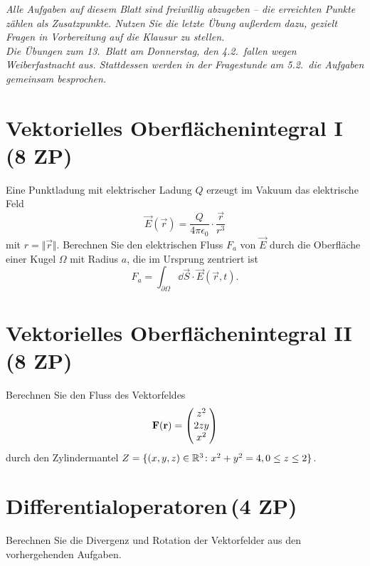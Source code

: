 \documentclass{scrartcl}
\begin{document}
\maketitle
\vspace{1em}
\emph{%
  Alle Aufgaben auf diesem Blatt sind freiwillig abzugeben -- die erreichten Punkte zählen als Zusatzpunkte.
  Nutzen Sie die letzte Übung außerdem dazu, gezielt Fragen in Vorbereitung auf die Klausur zu stellen.\\
  Die Übungen zum 13.\ Blatt am Donnerstag, den 4.2.\ fallen wegen Weiberfastnacht aus.
  Stattdessen werden in der Fragestunde am 5.2.\ die Aufgaben gemeinsam besprochen.
}
\section{Vektorielles Oberflächenintegral I\,(8 ZP)}
\label{sec:gau_scher_integralsatz}

Eine Punktladung mit elektrischer Ladung $Q$ erzeugt im Vakuum das elektrische Feld
\[
  \vec E(\vec r) = \frac{Q}{4\pi \epsilon_0} \cdot \frac{\vec r}{r^3}
\]
mit $r = \Vert \vec r \Vert$.
Berechnen Sie den elektrischen Fluss $F_a$ von $\vec E$ durch die Oberfläche einer Kugel $\Omega$ mit Radius $a$, die im Ursprung zentriert ist
\[
  F_a = \int_{\partial\Omega} \dd \vec S \cdot \vec E(\vec r, t).
\]


\section{Vektorielles Oberflächenintegral II\,(8 ZP)}
\label{sec:vektorielles_oberfl_chenintegral_ii}

Berechnen Sie den Fluss des Vektorfeldes
\[
  \mathbf{F}(\mathbf{r}) = \begin{pmatrix}z^2 \\ 2zy \\ x^2\end{pmatrix}
\]
durch den Zylindermantel $Z = \{ (x,y,z) \in \mathbb{R}^3 \colon x^2 + y^2 = 4, 0 \le z \le 2 \}$.


\section{Differentialoperatoren\,(4 ZP)}
\label{sec:differentialoperatoren}

 Berechnen Sie die Divergenz und Rotation der Vektorfelder aus den vorhergehenden Aufgaben.
\end{document}
